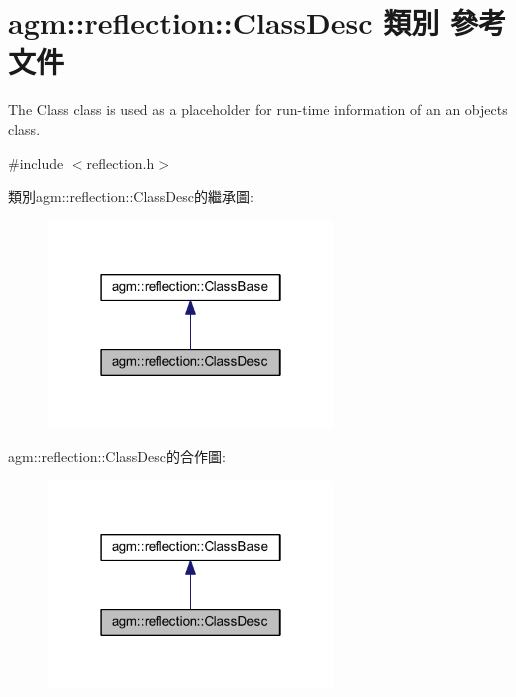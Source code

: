 \hypertarget{classagm_1_1reflection_1_1_class_desc}{}\section{agm\+:\+:reflection\+:\+:Class\+Desc 類別 參考文件}
\label{classagm_1_1reflection_1_1_class_desc}


The Class class is used as a placeholder for run-\/time information of an an object\textquotesingle{}s class.  




{\ttfamily \#include $<$reflection.\+h$>$}



類別agm\+:\+:reflection\+:\+:Class\+Desc的繼承圖\+:\nopagebreak
\begin{figure}[H]
\begin{center}
\leavevmode
\includegraphics[width=214pt]{classagm_1_1reflection_1_1_class_desc__inherit__graph}
\end{center}
\end{figure}


agm\+:\+:reflection\+:\+:Class\+Desc的合作圖\+:\nopagebreak
\begin{figure}[H]
\begin{center}
\leavevmode
\includegraphics[width=214pt]{classagm_1_1reflection_1_1_class_desc__coll__graph}
\end{center}
\end{figure}
